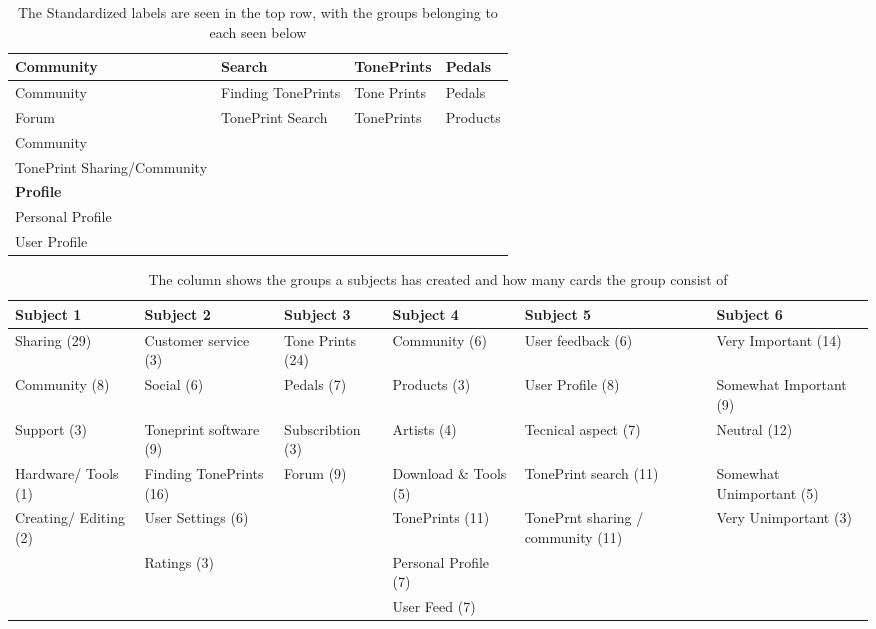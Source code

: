 \begin{table}[H]
\begin{tabular}{|l|l|l|l|}
\hline
\rowcolor{xGray25} \textbf{Community} & \textbf{Search} & \textbf{TonePrints} & \textbf{Pedals} \\ \hline
Community & Finding TonePrints & Tone Prints & Pedals \\
Forum & TonePrint Search & TonePrints & Products \\
Community & & & \\
TonePrint Sharing/Community & & & \\ \hline
\rowcolor{xGray25} \textbf{Profile} & & & \\ \hline
Personal Profile & & & \\
User Profile & & & \\ \hline
\end{tabular}
\caption{The Standardized labels are seen in the top row, with the groups belonging to each seen below}
\label{StandardizedLabels}
\end{table}

\begin{table}[h]
\small
\begin{tabularx}{\textwidth}{|R|R|R|R|R|R|}
\hline
{} \textbf{Subject 1} & \textbf{Subject 2} & \textbf{Subject 3} & \textbf{Subject 4} & \textbf{Subject 5} & \textbf{Subject 6} \\ \hline
Sharing (29) & Customer service (3) & Tone Prints (24) & Community (6) & User feedback (6) & Very Important (14) \\ \hline
Community (8) & Social (6) & Pedals (7) & Products (3) & User Profile (8) & Somewhat Important (9) \\ \hline
Support (3) & Toneprint software (9) & Subscribtion (3) & Artists (4) & Tecnical aspect (7) & Neutral (12) \\ \hline
Hardware/ Tools (1) & Finding TonePrints (16) & Forum (9) & Download \& Tools (5) & TonePrint search (11) & Somewhat Unimportant (5) \\ \hline
Creating/ Editing (2) & User Settings (6) && TonePrints (11) & TonePrnt sharing / community (11) & Very Unimportant (3) \\ \hline
& Ratings (3) && Personal Profile (7) && \\ \hline
&&& User Feed (7) && \\ \hline
\end{tabularx}
\caption{The column shows the groups a subjects has created and how many cards the group consist of}
\label{Tab:GroupOverview}
\end{table}


